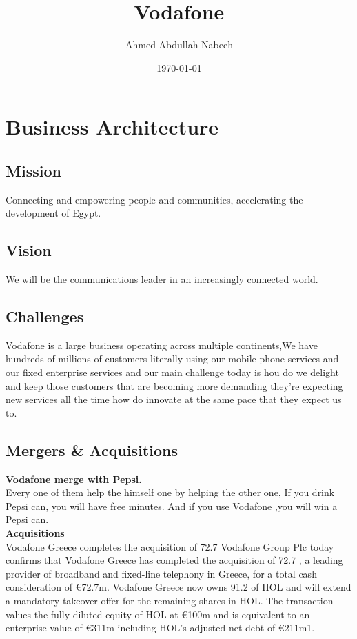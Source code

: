 \documentclass{book}
\begin{document}
\title{Vodafone}
\author{Ahmed Abdullah Nabeeh}
\date{\today}
\maketitle

\tableofcontents
\newpage

\chapter {Business Architecture}
\section {Mission}
Connecting and empowering people and communities, accelerating the development of Egypt.

\section{Vision}
We will be the communications leader in an increasingly connected world.

\section{Challenges}
Vodafone is a large business operating across multiple continents,We have hundreds of millions of customers literally using our mobile phone services and our 
fixed enterprise services and our main challenge today is hou do we delight and keep those customers that are becoming more demanding they're expecting new services
all the time how do innovate at the same pace that they expect us to.

\section{Mergers \& Acquisitions}

\textbf{Vodafone merge with Pepsi.}\\
Every one of them help the himself one by helping the other one, If you drink Pepsi can, you will have free minutes.
And if you use Vodafone ,you will win a Pepsi can.\\
\textbf{Acquisitions}\\
Vodafone Greece completes the acquisition of 72.7%
Vodafone Group Plc today confirms that Vodafone Greece has completed the 
acquisition of 72.7%
, a leading provider of broadband and fixed-line telephony in Greece, 
for a total cash consideration of €72.7m. Vodafone Greece now owns 91.2%
of HOL and will extend a mandatory takeover offer for the remaining shares 
in HOL.  The transaction values the fully diluted equity of HOL at €100m and 
is equivalent to an enterprise value of €311m including HOL’s adjusted net 
debt of €211m1.
\end{document}
